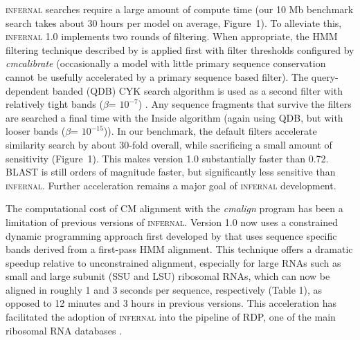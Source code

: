 \textsc{infernal} searches require a large amount of compute time
(our 10 Mb benchmark search takes about 30 hours per
model on average, Figure~1). To alleviate this, \textsc{infernal} 1.0 implements
two rounds of filtering.  When appropriate, the HMM filtering technique
described by \citet{WeinbergRuzzo06} is applied
first with filter thresholds configured by \emph{cmcalibrate}
(occasionally a model with little primary sequence conservation cannot
be usefully accelerated by a primary sequence based filter).  The
query-dependent banded (QDB) CYK search algorithm is used as a second
filter with relatively tight bands ($\beta$= $10^{-7}$)
\citep{NawrockiEddy07}.  Any sequence fragments that survive the filters are
searched a final time with the Inside algorithm (again using QDB, but with looser
bands ($\beta$= $10^{-15}$)).
In our benchmark, the default filters accelerate similarity search by
about 30-fold overall, while sacrificing a small amount of sensitivity
(Figure~1). This makes version 1.0 substantially faster than
0.72. \textsc{BLAST} is still orders of magnitude faster, but
significantly less sensitive than \textsc{infernal}. Further
acceleration remains a major goal of \textsc{infernal} development.

The computational cost of CM alignment with the \emph{cmalign} program
has been a limitation of previous versions of
\textsc{infernal}. Version 1.0 now uses a constrained dynamic
programming approach first developed by \citet{Brown00}
that uses sequence specific bands derived from a first-pass HMM
alignment. This technique offers a dramatic speedup relative to
unconstrained alignment, especially for large RNAs such as small and
large subunit (SSU and LSU) ribosomal RNAs, which can now be aligned
in roughly 1 and 3 seconds per sequence, respectively (Table 1), as
opposed to 12 minutes and 3 hours in previous versions.
This acceleration has facilitated the adoption of \textsc{infernal}
into the pipeline of RDP, one of the main ribosomal RNA databases
\citep{Cole09}.


